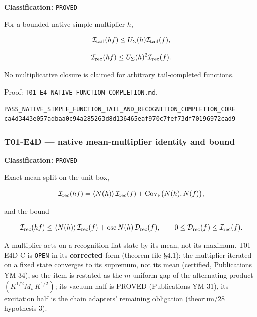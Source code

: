 \textbf{Classification:} \texttt{PROVED}

For a bounded native simple multiplier \(h\),

\[
\mathcal I_{\rm tail}(hf)
\le U_\Sigma(h)\mathcal I_{\rm tail}(f),
\]

\[
\mathcal I_{\rm rec}(hf)
\le U_\Sigma(h)^2\mathcal I_{\rm rec}(f).
\]

No multiplicative closure is claimed for arbitrary tail-completed functions.

Proof:
\texttt{T01\_E4\_NATIVE\_FUNCTION\_COMPLETION.md}.

\begin{verbatim}
PASS_NATIVE_SIMPLE_FUNCTION_TAIL_AND_RECOGNITION_COMPLETION_CORE
ca4d3443e057adbaa0c94a285263d8d136465eaf970c7fef73df70196972cad9
\end{verbatim}

\hypertarget{t01-e4d-native-mean-multiplier-identity-and-bound}{%
\subsubsection{T01-E4D --- native mean-multiplier identity and bound}\label{t01-e4d-native-mean-multiplier-identity-and-bound}}

\textbf{Classification:} \texttt{PROVED}

Exact mean split on the unit box,

\[
\mathcal I_{\rm rec}(hf)
=
\langle N(h)\rangle\,\mathcal I_{\rm rec}(f)
+\operatorname{Cov}_\nu\bigl(N(h),N(f)\bigr),
\]

and the bound

\[
\mathcal I_{\rm rec}(hf)
\le
\langle N(h)\rangle\,\mathcal I_{\rm rec}(f)
+\operatorname{osc}N(h)\,\mathcal D_{\rm rec}(f),
\qquad
0\le\mathcal D_{\rm rec}(f)\le\mathcal I_{\rm rec}(f).
\]

A multiplier acts on a recognition-flat state by its mean, not its maximum.
T01-E4D-C is \texttt{OPEN} in its \textbf{corrected} form (theorem file §4.1): the
multiplier iterated on a fixed state converges to its supremum, not its mean
(certified, Publications YM-34), so the item is restated as the \(m\)-uniform
gap of the alternating product \((K^{1/2}M_wK^{1/2})\); its vacuum half is
PROVED (Publications YM-31), its excitation half is the chain adapters'
remaining obligation (theorum/28 hypothesis 3).

